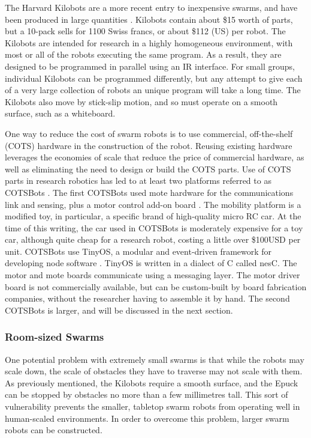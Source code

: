 The Harvard Kilobots are a more recent entry to inexpensive swarms, and have been produced in large quantities \cite{rubenstein2014kilobot}. 
Kilobots contain about \$15 worth of parts, but a 10-pack sells for 1100 Swiss francs, or about \$112 (US) per robot. 
The Kilobots are intended for research in a highly homogeneous environment, with most or all of the robots executing the same program. 
As a result, they are designed to be programmed in parallel using an IR interface. 
For small groups, individual Kilobots can be programmed differently, but any attempt to give each of a very large collection of robots an unique program will take a long time. 
The Kilobots also move by stick-slip motion, and so must operate on a smooth surface, such as a whiteboard. 

One way to reduce the cost of swarm robots is to use commercial, off-the-shelf (COTS) hardware in the construction of the robot. 
Reusing existing hardware leverages the economies of scale that reduce the price of commercial hardware, as well as eliminating the need to design or build the COTS parts. 
Use of COTS parts in research robotics has led to at least two platforms referred to as COTSBots \cite{bergbreiter2003cotsbots, soule2011cotsbots}.
The first COTSBots used mote hardware for the communications link and sensing, plus a motor control add-on board \cite{bergbreiter2003cotsbots}. 
The mobility platform is a modified toy, in particular, a specific brand of high-quality micro RC car.
At the time of this writing, the car used in COTSBots is moderately expensive for a toy car, although quite cheap for a research robot, costing a little over \$100USD per unit. 
COTSBots use TinyOS, a modular and event-driven framework for developing node software \cite{levis2005tinyos}. 
TinyOS is written in a dialect of C called nesC. The motor and mote boards communicate using a messaging layer. 
The motor driver board is not commercially available, but can be custom-built by board fabrication companies, without the researcher having to assemble it by hand. 
The second COTSBots is larger, and will be discussed in the next section. 

\subsubsection{Room-sized Swarms}

One potential problem with extremely small swarms is that while the robots may scale down, the scale of obstacles they have to traverse may not scale with them. 
As previously mentioned, the Kilobots require a smooth surface, and the Epuck can be stopped by obstacles no more than a few millimetres tall. 
This sort of vulnerability prevents the smaller, tabletop swarm robots from operating well in human-scaled environments. 
In order to overcome this problem, larger swarm robots can be constructed.
 
